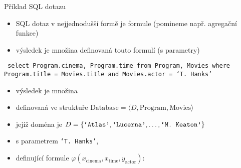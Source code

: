 \documentclass{beamer}
\begin{document}
\begin{frame}{Příklad SQL dotazu}

    \begin{itemize}
        \item  SQL dotaz v nejjednodušší formě je formule (pomineme např. \alert{agregační funkce})
        \item výsledek je množina definovaná touto formulí (s parametry) 
       \end{itemize}
    
    \begin{center}
    \end{center}

    \vspace{-6pt}
        
    {\tt\footnotesize
    \alert{select} Program.cinema, Program.time \alert{from} Program, Movies \alert{where} Program.title = Movies.title  \alert{and} Movies.actor = `T. Hanks' 
    }  
    
    \begin{itemize}
        \item výsledek je množina 
        \item definovaná ve struktuře \alert{$\text{Database}=\langle D, \mathrm{Program}, \mathrm{Movies}\rangle$}
        \item jejíž doména je {\small $D=\{\text{\tt`Atlas'},\text{\tt`Lucerna'},\dots,\text{\tt`M. Keaton'}\}$}
        \item s parametrem \alert{\small\tt`T. Hanks'}, 
        \item definující formule \alert{\small $\varphi(x_\mathrm{cinema},x_\mathrm{time},y_\mathrm{actor})$}:
        
        \medskip
    \end{itemize}

\end{frame}
\end{document}
